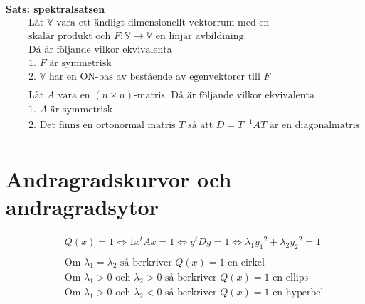 \textbf{Sats: spektralsatsen}
\begin{align*}
  &\quad  \text{Låt $\mathbb{V}$ vara ett ändligt dimensionellt vektorrum med en } \\
  &\quad  \text{skalär produkt och $F:\mathbb{V}\to\mathbb{V}$ en linjär avbildining.} \\
  &\quad  \text{Då är följande vilkor ekvivalenta} \\
  &\quad  \text{1. $F$ är symmetrisk} \\
  &\quad  \text{2. $\mathbb{V}$ har en ON-bas av bestående av egenvektorer till $F$} \\
  &\quad  \\
  &\quad  \text{Låt $A$ vara en $(n\times{n})$-matris. Då är följande vilkor ekvivalenta} \\
  &\quad  \text{1. $A$ är symmetrisk} \\
  &\quad  \text{2. Det finns en ortonormal matris $T$ så att $D=T^{-1}AT$ är en diagonalmatris} \\
\end{align*}


\newpage

\section{Andragradskurvor och andragradsytor}
\begin{align*}
  &\quad  Q(x)=1
  \Leftrightarrow 1 x^t A x = 1
  \Leftrightarrow y^t D y = 1
  \Leftrightarrow \lambda_1 {y_1}^2 + \lambda_2 {y_2}^2 = 1 \\
  &\quad  \\
  &\quad  \text{Om $\lambda_1 = \lambda_2$ så berkriver $Q(x)=1$ en cirkel} \\
  &\quad  \text{Om $\lambda_1 > 0$ och $\lambda_2 > 0$ så berkriver $Q(x)=1$ en ellips} \\
  &\quad  \text{Om $\lambda_1 > 0$ och $\lambda_2 < 0$ så berkriver $Q(x)=1$ en hyperbel} \\
\end{align*}

